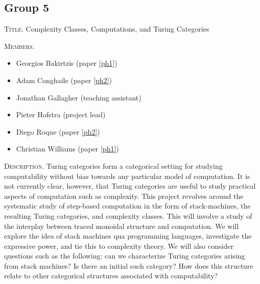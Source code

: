 \documentclass[11pt, oneside]{article}
\begin{document}
\subsection*{Group 5}

\textsc{Title.}  Complexity Classes, Computations,
and Turing Categories

\textsc{Members.}
\begin{multicols}{2}
  \begin{itemize}
  \item Georgios Bakirtzis (paper \ref{ph1})
  \item Adam Conghaile (paper \ref{ph2})
  \item Jonathan Gallagher (teaching assistant)
  \item Pieter Hofstra (project lead)
  \item Diego Roque (paper \ref{ph2})
  \item Christian Williams (paper \ref{ph1})
  \end{itemize}
\end{multicols}

\textsc{Description.}
Turing categories form a categorical setting for studying
computability without bias towards any particular model of
computation. It is not currently clear, however, that Turing
categories are useful to study practical aspects of
computation such as complexity. This project revolves around
the systematic study of step-based computation in the form
of stack-machines, the resulting Turing categories, and
complexity classes. This will involve a study of the
interplay between traced monoidal structure and
computation. We will explore the idea of stack machines qua
programming languages, investigate the expressive power, and
tie this to complexity theory. We will also consider
questions such as the following: can we characterize Turing
categories arising from stack machines? Is there an initial
such category? How does this structure relate to other
categorical structures associated with computability?
\end{document}

